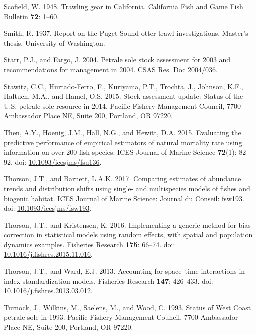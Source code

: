 \documentclass[12pt,]{article}
\begin{document}
\hypertarget{ref-scofield_trawling_1948}{}
Scofield, W. 1948. Trawling gear in California. California Fish and Game
Fish Bulletin \textbf{72}: 1--60.

\hypertarget{ref-smith_report_1937}{}
Smith, R. 1937. Report on the Puget Sound otter trawl investigations.
Master's thesis, University of Washington.

\hypertarget{ref-starr_petrale_2004}{}
Starr, P.J., and Fargo, J. 2004. Petrale sole stock assessment for 2003
and recommendations for management in 2004. CSAS Res. Doc 2004/036.

\hypertarget{ref-stawitz_stock_2015}{}
Stawitz, C.C., Hurtado-Ferro, F., Kuriyama, P.T., Trochta, J., Johnson,
K.F., Haltuch, M.A., and Hamel, O.S. 2015. Stock assessment update:
Status of the U.S. petrale sole resource in 2014. Pacific Fishery
Management Council, 7700 Ambassador Place NE, Suite 200, Portland, OR
97220.

\hypertarget{ref-then_evaluating_2015}{}
Then, A.Y., Hoenig, J.M., Hall, N.G., and Hewitt, D.A. 2015. Evaluating
the predictive performance of empirical estimators of natural mortality
rate using information on over 200 fish species. ICES Journal of Marine
Science \textbf{72}(1): 82--92. doi:
\href{https://doi.org/10.1093/icesjms/fsu136}{10.1093/icesjms/fsu136}.

\hypertarget{ref-thorson_comparing_2017}{}
Thorson, J.T., and Barnett, L.A.K. 2017. Comparing estimates of
abundance trends and distribution shifts using single- and multispecies
models of fishes and biogenic habitat. ICES Journal of Marine Science:
Journal du Conseil: fsw193. doi:
\href{https://doi.org/10.1093/icesjms/fsw193}{10.1093/icesjms/fsw193}.

\hypertarget{ref-thorson_implementing_2016}{}
Thorson, J.T., and Kristensen, K. 2016. Implementing a generic method
for bias correction in statistical models using random effects, with
spatial and population dynamics examples. Fisheries Research
\textbf{175}: 66--74. doi:
\href{https://doi.org/10.1016/j.fishres.2015.11.016}{10.1016/j.fishres.2015.11.016}.

\hypertarget{ref-thorson_accounting_2013}{}
Thorson, J.T., and Ward, E.J. 2013. Accounting for space--time
interactions in index standardization models. Fisheries Research
\textbf{147}: 426--433. doi:
\href{https://doi.org/10.1016/j.fishres.2013.03.012}{10.1016/j.fishres.2013.03.012}.

\hypertarget{ref-turnock_status_1993}{}
Turnock, J., Wilkins, M., Saelens, M., and Wood, C. 1993. Status of West
Coast petrale sole in 1993. Pacific Fishery Management Council, 7700
Ambassador Place NE, Suite 200, Portland, OR 97220.
\end{document}
